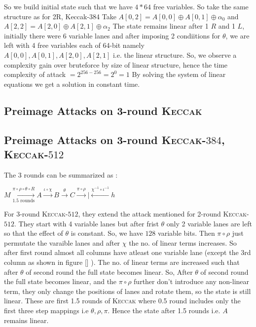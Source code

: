 \documentclass[runningheads]{llncs}
\newcommand{\KECCAK}{\mbox{\textsc{Keccak}}}
\begin{document}
\begin{enumerate}
			So we build initial state such that we have $4*64$ free variables. So take the same structure as for 2R, Keccak-384
    	Take $A[0, 2] = A[0, 0] \oplus A[0, 1] \oplus \alpha_0$
    	and $A[2, 2] = A[2, 0] \oplus A[2, 1] \oplus \alpha_2$
  		The state remains linear after 1 $R$ and 1 $L$, initially there were 6 variable lanes and after imposing 2 condiitions for $\theta$, we are left with 4 free variables each of 64-bit namely $A[0,0], A[0,1], A[2, 0], A[2,1]$ i.e. the linear structure.
			So, we observe a complexity gain over bruteforce by size of linear structure, hence the time complexity of attack $ = 2^{256 - 256} = 2^{0} = 1$
    	By solving the system of linear equations we get a solution in constant time.
\end{enumerate}

\subsection{Preimage Attacks on 3-round \KECCAK}
\subsection{Preimage Attacks on 3-round \KECCAK-$384$, \KECCAK-$512$}

		The 3 rounds can be summarized as :
    
    $ M \xrightarrow[\text{1.5 rounds}]{ \pi \circ \rho \circ \theta \circ R} A \xrightarrow[]{ \iota \circ \chi } B \xrightarrow[]{ \theta } C \xrightarrow[]{ \pi \circ \rho } | \xleftarrow[]{ \chi^{-1} \circ \iota^{-1} } h  $

		For 3-round \KECCAK-$512$, they extend the attack mentioned for 2-round \KECCAK-$512$. They start with 4 variable lanes but after frist $\theta$ only 2 variable lanes are left so that the effect of $\theta$ is constant. So, we have $128$ variable bits. Then $\pi \circ \rho$ just permutate the varaible lanes and after $\chi$ the no. of linear terms increases. So after first round almost all columns have atleast one variable lane (except the 3rd column as shown in figure [] ). The no. of linear terms are increased such that after $\theta$ of second round the full state becomes linear. So, After $\theta$ of second round the full state becomes linear, and the $\pi \circ \rho$ further don't introduce any non-linear term, they only change the positions of lanes and rotate them, so the state is still linear.  These are first 1.5 rounds of \KECCAK{} where 0.5 round includes only the first three step mappings i.e $\theta, \rho, \pi$. Hence the state after 1.5 rounds i.e. $A$ remains linear.
		
\end{document}
